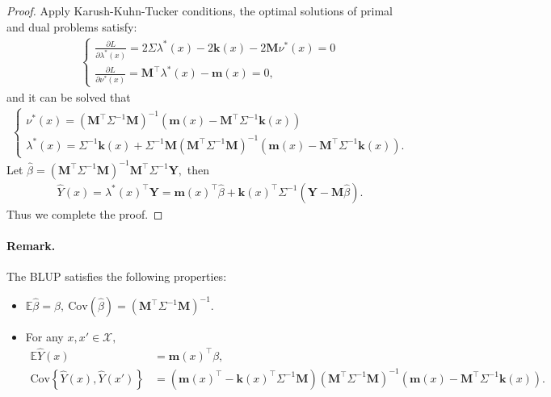 \documentclass{article}
\begin{document}
\begin{proof}
Apply Karush-Kuhn-Tucker conditions, the optimal solutions of primal and dual problems satisfy:
\begin{align*}
	\begin{cases}
		\frac{\partial L}{\partial\lambda^*(x)} = 2\Sigma\lambda^*(x) - 2\mathbf{k}(x) - 2\mathbf{M}\nu^*(x) = 0\\
		\frac{\partial L}{\partial\nu^*(x)} = \mathbf{M}^\top\lambda^*(x) - \mathbf{m}(x) = 0,
	\end{cases}\tag{4.36}
\end{align*}
and it can be solved that 
\begin{align*}
	\begin{cases}
		\nu^*(x) = \left(\mathbf{M}^\top\Sigma^{-1}\mathbf{M}\right)^{-1}\left(\mathbf{m}(x) - \mathbf{M}^\top\Sigma^{-1}\mathbf{k}(x)\right)\\
		\lambda^*(x) = \Sigma^{-1}\mathbf{k}(x) + \Sigma^{-1}\mathbf{M}\left(\mathbf{M}^\top\Sigma^{-1}\mathbf{M}\right)^{-1}\left(\mathbf{m}(x) - \mathbf{M}^\top\Sigma^{-1}\mathbf{k}(x)\right).
	\end{cases} \tag{4.37}
\end{align*}
Let $\hat{\beta} = \left(\mathbf{M}^\top\Sigma^{-1}\mathbf{M}\right)^{-1}\mathbf{M}^\top\Sigma^{-1}\mathbf{Y},$ then
\begin{align*}
	\hat{Y}(x) = \lambda^*(x)^\top\mathbf{Y} = \mathbf{m}(x)^\top\hat{\beta} + \mathbf{k}(x)^\top\Sigma^{-1}\left(\mathbf{Y} - \mathbf{M}\hat{\beta}\right).\tag{4.38}
\end{align*}
Thus we complete the proof.
\end{proof} 

\paragraph{Remark.} The BLUP satisfies the following properties:
\begin{itemize}
	\item  $\mathbb{E}\hat{\beta} = \beta,\ \mathrm{Cov}(\hat{\beta}) = \left(\mathbf{M}^\top\Sigma^{-1}\mathbf{M}\right)^{-1}.$
	\item For any $x,x'\in\mathcal{X},$
	\begin{align*}
		\mathbb{E}\hat{Y}(x) &= \mathbf{m}(x)^\top\beta,\tag{4.39}\\
		\mathrm{Cov}\left\lbrace\hat{Y}(x), \hat{Y}(x')\right\rbrace &= \left(\mathbf{m}(x)^\top - \mathbf{k}(x)^\top\Sigma^{-1}\mathbf{M}\right)\left(\mathbf{M}^\top\Sigma^{-1}\mathbf{M}\right)^{-1}\left(\mathbf{m}(x) - \mathbf{M}^\top\Sigma^{-1}\mathbf{k}(x)\right).\tag{4.40}
	\end{align*}
\end{itemize}
\end{document}
